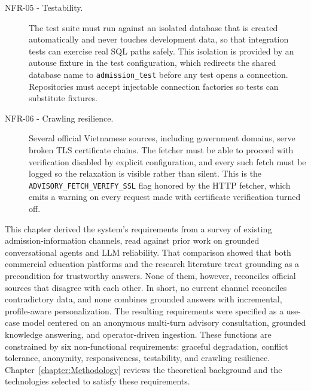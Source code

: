 \documentclass[../main.tex]{subfiles}
\begin{document}
\begin{description}
    \item[NFR-05 - Testability.]
    The test suite must run against an isolated database that is created automatically and never touches development data, so that integration tests can exercise real \gls{SQL} paths safely.
    This isolation is provided by an autouse fixture in the test configuration, which redirects the shared database name to \texttt{admission\_test} before any test opens a connection.
    Repositories must accept injectable connection factories so tests can substitute fixtures.

    \item[NFR-06 - Crawling resilience.]
    Several official Vietnamese sources, including government domains, serve broken \gls{TLS} certificate chains.
    The fetcher must be able to proceed with verification disabled by explicit configuration, and every such fetch must be logged so the relaxation is visible rather than silent.
    This is the \texttt{ADVISORY\_FETCH\_VERIFY\_SSL} flag honored by the HTTP fetcher, which emits a warning on every request made with certificate verification turned off.
\end{description}

This chapter derived the system's requirements from a survey of existing admission-information channels, read against prior work on grounded conversational agents and \gls{LLM} reliability.
That comparison showed that both commercial education platforms and the research literature treat grounding as a precondition for trustworthy answers.
None of them, however, reconciles official sources that disagree with each other.
In short, no current channel reconciles contradictory data, and none combines grounded answers with incremental, profile-aware personalization.
The resulting requirements were specified as a use-case model centered on an anonymous multi-turn advisory consultation, grounded knowledge answering, and operator-driven ingestion.
These functions are constrained by six non-functional requirements: graceful degradation, conflict tolerance, anonymity, responsiveness, testability, and crawling resilience.
Chapter~\ref{chapter:Methodology} reviews the theoretical background and the technologies selected to satisfy these requirements.
\end{document}
